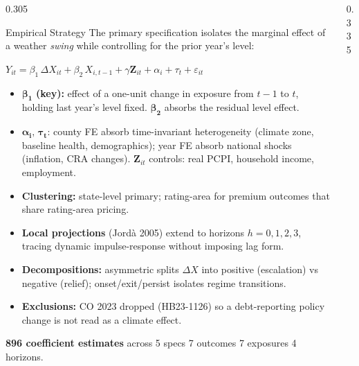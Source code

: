 \documentclass[final,t]{beamer}
\begin{document}
\begin{frame}[t,fragile]
\begin{columns}[t]
\begin{column}{0.305\paperwidth}
\vspace{3mm}

\begin{posterblock}{Empirical Strategy}
\normalsize
The primary specification isolates the marginal effect of a weather \emph{swing} while controlling for the prior year's level:

\vspace{1mm}
\begin{center}
\setlength{\fboxsep}{3mm}
\colorbox{softgray}{%
\parbox{0.92\linewidth}{%
\centering\large
$Y_{it} = \beta_1\,\Delta X_{it} + \beta_2\,X_{i,t-1} + \gamma\mathbf{Z}_{it} + \alpha_i + \tau_t + \varepsilon_{it}$}}
\end{center}
\vspace{1mm}

\begin{itemize}
\setlength\itemsep{1mm}
\item $\boldsymbol{\beta_1}$ \textbf{(key):} effect of a one-unit change in exposure from $t{-}1$ to $t$, holding last year's level fixed. $\boldsymbol{\beta_2}$ absorbs the residual level effect.
\item $\boldsymbol{\alpha_i,\,\tau_t}$: county FE absorb time-invariant heterogeneity (climate zone, baseline health, demographics); year FE absorb national shocks (inflation, CRA changes). $\mathbf{Z}_{it}$ controls: real PCPI, household income, employment.
\item \textbf{Clustering:} state-level primary; rating-area for premium outcomes that share rating-area pricing.
\item \textbf{Local projections} (Jordà 2005) extend to horizons $h=0,1,2,3$, tracing dynamic impulse-response without imposing lag form.
\item \textbf{Decompositions:} asymmetric splits $\Delta X$ into positive (escalation) vs negative (relief); onset/exit/persist isolates regime transitions.
\item \textbf{Exclusions:} CO 2023 dropped (HB23-1126) so a debt-reporting policy change is not read as a climate effect.
\end{itemize}

\vspace{1mm}
\textbf{896 coefficient estimates} across 5 specs \texttimes{} 7 outcomes \texttimes{} 7 exposures \texttimes{} 4 horizons.
\end{posterblock}

\end{column}

\begin{column}{0.335\paperwidth}


\end{column}
\end{columns}
\end{frame}
\end{document}
